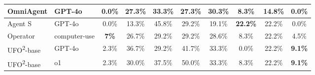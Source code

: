\documentclass[sigplan,10pt]{acmart}
\newcommand{\name}{\textsc{UFO}\textsuperscript{2}\xspace}
\begin{document}
\begin{table}[t]
\begin{tabular}{l|l|cccccc|cc}
OmniAgent                       & GPT-4o                          & \multicolumn{1}{c|}{0.0\%}        & \multicolumn{1}{c|}{27.3\%}                                                 & \multicolumn{1}{c|}{33.3\%}                                                    & \multicolumn{1}{c|}{27.3\%}          & \multicolumn{1}{c|}{30.3\%}                                                    & 8.3\%                                                    & \multicolumn{1}{c|}{14.8\%}          & 0.0\%          \\ \hline
Agent S                         & GPT-4o                          & \multicolumn{1}{c|}{0.0\%}        & \multicolumn{1}{c|}{13.3\%}                                                 & \multicolumn{1}{c|}{45.8\%}                                                    & \multicolumn{1}{c|}{29.2\%}          & \multicolumn{1}{c|}{19.1\%}                                                    & \textbf{22.2\%}                                          & \multicolumn{1}{c|}{22.2\%}          & 0.0\%          \\ \hline
Operator                        & computer-use                    & \multicolumn{1}{c|}{\textbf{7\%}} & \multicolumn{1}{c|}{26.7\%}                                                 & \multicolumn{1}{c|}{29.2\%}                                                    & \multicolumn{1}{c|}{29.2\%}          & \multicolumn{1}{c|}{28.6\%}                                                    & 8.3\%                                                    & \multicolumn{1}{c|}{22.2\%}          & 4.5\%          \\ \hline\hline
\name-base                      & GPT-4o                          & \multicolumn{1}{c|}{2.3\%}        & \multicolumn{1}{c|}{36.7\%}                                                 & \multicolumn{1}{c|}{29.2\%}                                                    & \multicolumn{1}{c|}{41.7\%}          & \multicolumn{1}{c|}{33.3\%}                                                    & 0.0\%                                                    & \multicolumn{1}{c|}{22.2\%}          & \textbf{9.1\%} \\ \hline
\name-base                      & o1                              & \multicolumn{1}{c|}{2.3\%}        & \multicolumn{1}{c|}{30.0\%}                                                 & \multicolumn{1}{c|}{37.5\%}                                                    & \multicolumn{1}{c|}{50.0\%}          & \multicolumn{1}{c|}{33.3\%}                                                    & 8.3\%                                                    & \multicolumn{1}{c|}{22.2\%}          & \textbf{9.1\%} \\ \hline

\end{tabular}
\end{table}
\end{document}
